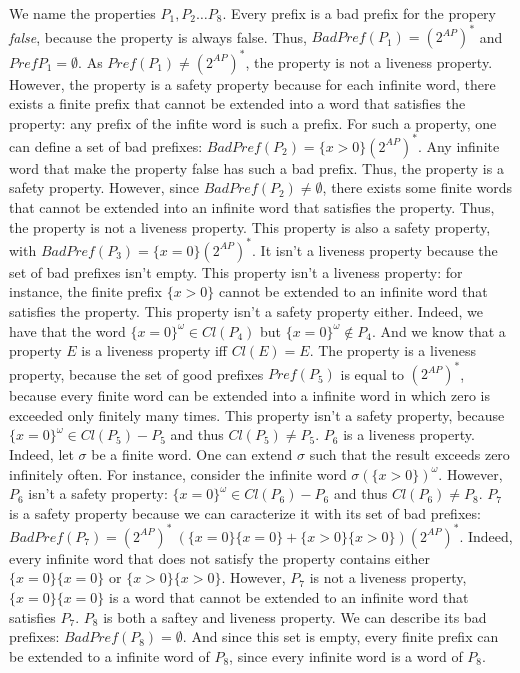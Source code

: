 \documentclass[11pt,a4paper]{article}
\newcommand\badp{\mathit{BadPref}}
\newcommand\pref{\mathit{Pref}}
\newcommand\twoap{2^{AP}}
\renewcommand\star{^*}
\newcommand\cl{\mathit{Cl}}
\begin{document}
\begin{Answer}


We name the properties $P_1, P_2\dots P_8$.
  \Question%
Every prefix is a bad prefix for the propery \textit{false}, because the property is always false. Thus, $\badp(P_1) = (\twoap)\star$ and $\pref{P_1} = \emptyset$. As $\pref(P_1)\neq (\twoap)\star$, the property is not a liveness property. However, the property is a safety property because for each infinite word, there exists a finite prefix that cannot be extended into a word that satisfies the property: any prefix of the infite word is such a prefix. %
  \Question%
For such a property, one can define a set of bad prefixes: $\badp(P_2) = \{x > 0\}(\twoap)\star$. Any infinite word that make the property false has such a bad prefix. Thus, the property is a safety property. However, since $\badp(P_2)\neq\emptyset$, there exists some finite words that cannot be extended into an infinite word that satisfies the property. Thus, the property is not a liveness property.
  \Question%
This property is also a safety property, with $\badp(P_3) = \{x=0\}(\twoap)\star$. It isn't a liveness property because the set of bad prefixes isn't empty.
  \Question%
This property isn't a liveness property: for instance, the finite prefix $\{x>0\}$ cannot be extended to an infinite word that satisfies the property.
This property isn't a safety property either. Indeed, we have that the word ${\{x=0\}}^\omega\in\cl(P_4)$ but ${\{x=0\}}^\omega\not\in P_4$. And we know that a property $E$ is a liveness property iff $\cl(E)=E$.
  \Question%
The property is a liveness property, because the set of good prefixes $\pref(P_5)$ is equal to $(\twoap)\star$, because  every finite word can be extended into a infinite word in which zero is exceeded only finitely many times. This property isn't a safety property, because ${\{x=0\}}^\omega\in\cl(P_5)-P_5$ and thus $\cl(P_5)\neq P_5$.
  \Question%
$P_6$ is a liveness property. Indeed, let $\sigma$ be a finite word. One can extend $\sigma$ such that the result exceeds zero infinitely often. For instance, consider the infinite word ${\sigma(\{x>0\})}^\omega$.
However, $P_6$ isn't a safety property: ${\{x=0\}}^\omega\in\cl(P_6)-P_6$ and thus $\cl(P_6)\neq P_8$.
  \Question%
$P_7$ is a safety property because we can caracterize it with its set of bad prefixes: $\badp(P_7)=(\twoap)\star\ (\{x=0\}\{x=0\} + \{x>0\}\{x>0\}) (\twoap)\star$. Indeed, every infinite word that does not satisfy the property contains either $\{x=0\}\{x=0\}$ or $\{x>0\}\{x>0\}$.
However, $P_7$ is not a liveness property, $\{x=0\}\{x=0\}$ is a word that cannot be extended to an infinite word that satisfies $P_7$.
  \Question%
$P_8$ is both a saftey and liveness property. We can describe its bad prefixes: $\badp(P_8)=\emptyset$. And since this set is empty, every finite prefix can be extended to a infinite word of $P_8$, since every infinite word is a word of $P_8$.
\end{Answer}
\end{document}
